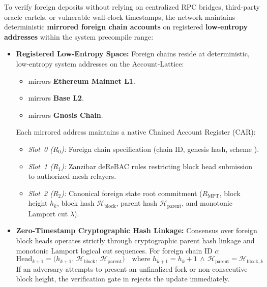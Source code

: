 \documentclass[a4paper,11pt,twoside,parskip=half-,headings=small]{scrartcl}
\begin{document}
To verify foreign deposits without relying on centralized RPC bridges, third-party oracle cartels, or vulnerable wall-clock timestamps, the network maintains deterministic \textbf{mirrored foreign chain accounts} on registered \textbf{low-entropy addresses} within the system precompile range:
\begin{itemize}[nosep]
  \item \textbf{Registered Low-Entropy Space:}
  Foreign chains reside at deterministic, low-entropy system addresses on the Account-Lattice:
  \begin{itemize}[nosep]
    \item {} mirrors \textbf{Ethereum Mainnet L1}.
    \item {} mirrors \textbf{Base L2}.
    \item {} mirrors \textbf{Gnosis Chain}.
  \end{itemize}
  Each mirrored address maintains a native Chained Account Register (CAR):
  \begin{itemize}[nosep]
    \item \emph{Slot~0 ($R_0$):} Foreign chain specification (chain ID, genesis hash, scheme ).
    \item \emph{Slot~1 ($R_1$):} Zanzibar deReBAC rules restricting block head submission to authorized mesh relayers.
    \item \emph{Slot~2 ($R_2$):} Canonical foreign state root commitment ($R_{\text{MPT}}$, block height $h_k$, block hash $\mathcal{H}_{\text{block}}$, parent hash $\mathcal{H}_{\text{parent}}$, and monotonic Lamport cut $\lambda$).
  \end{itemize}

  \item \textbf{Zero-Timestamp Cryptographic Hash Linkage:}
  Consensus over foreign block heads operates strictly through cryptographic parent hash linkage and monotonic Lamport logical cut sequences. For foreign chain ID $c$:
  \begin{equation}
    \text{Head}_{k+1} = \bigl(h_{k+1},\, \mathcal{H}_{\text{block}},\, \mathcal{H}_{\text{parent}}\bigr) \quad \text{where } h_{k+1} = h_k + 1 \,\land\, \mathcal{H}_{\text{parent}} = \mathcal{H}_{\text{block}, k}
  \end{equation}
  If an adversary attempts to present an unfinalized fork or non-consecutive block height, the  verification gate in  rejects the update immediately.
  

\end{itemize}
\end{document}
